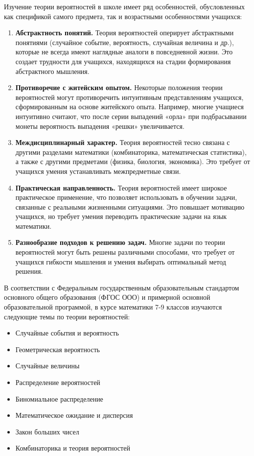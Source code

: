 \documentclass[a4paper,14pt]{extreport}
\begin{document}
Изучение теории вероятностей в школе имеет ряд особенностей, обусловленных как спецификой самого предмета, так и возрастными особенностями учащихся:

\begin{enumerate}
    \item \textbf{Абстрактность понятий.} Теория вероятностей оперирует абстрактными понятиями (случайное событие, вероятность, случайная величина и др.), которые не всегда имеют наглядные аналоги в повседневной жизни. Это создает трудности для учащихся, находящихся на стадии формирования абстрактного мышления.
    
    \item \textbf{Противоречие с житейским опытом.} Некоторые положения теории вероятностей могут противоречить интуитивным представлениям учащихся, сформированным на основе житейского опыта. Например, многие учащиеся интуитивно считают, что после серии выпадений «орла» при подбрасывании монеты вероятность выпадения «решки» увеличивается.
    
    \item \textbf{Междисциплинарный характер.} Теория вероятностей тесно связана с другими разделами математики (комбинаторика, математическая статистика), а также с другими предметами (физика, биология, экономика). Это требует от учащихся умения устанавливать межпредметные связи.
    
    \item \textbf{Практическая направленность.} Теория вероятностей имеет широкое практическое применение, что позволяет использовать в обучении задачи, связанные с реальными жизненными ситуациями. Это повышает мотивацию учащихся, но требует умения переводить практические задачи на язык математики.
    
    \item \textbf{Разнообразие подходов к решению задач.} Многие задачи по теории вероятностей могут быть решены различными способами, что требует от учащихся гибкости мышления и умения выбирать оптимальный метод решения.
\end{enumerate}

В соответствии с Федеральным государственным образовательным стандартом основного общего образования (ФГОС ООО) и примерной основной образовательной программой, в курсе математики 7-9 классов изучаются следующие темы по теории вероятностей:

\begin{itemize}
    \item Случайные события и вероятность
    \item Геометрическая вероятность
    \item Случайные величины
    \item Распределение вероятностей
    \item Биномиальное распределение
    \item Математическое ожидание и дисперсия
    \item Закон больших чисел
    \item Комбинаторика и теория вероятностей
\end{itemize}
\end{document}

